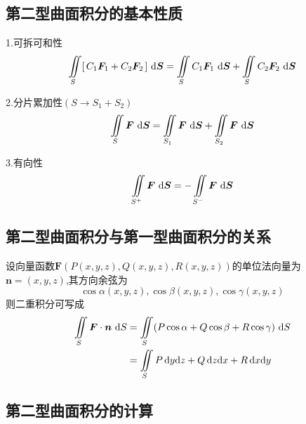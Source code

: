 \subsection{第二型曲面积分的基本性质}
\ttheorem[第二型曲面积分的三个基本性质]
1.可拆可和性
\begin{equation}
	\iint\limits_{S}[\,C_1\bm{F}_1+C_2\bm{F}_2\,]\,\,{\rm{d}} \bm{S} =\iint\limits_{S}C_1\bm{F}_1\,\,{\rm{d}} \bm{S}  + \iint\limits_{S}C_2\bm{F}_2\,\,{\rm{d}} \bm{S} 
\end{equation}

\par 2.分片累加性$(S\rightarrow S_1+S_2)$
\begin{equation}
	\iint\limits_{S}\bm{F}\,\,{\rm{d}} \bm{S}  = \iint\limits_{S_1}\bm{F}\,\,{\rm{d}} \bm{S}  +\iint\limits_{S_2}\bm{F}\,\,{\rm{d}} \bm{S} 
\end{equation}

\par 3.有向性
\begin{equation}
	\iint\limits_{S^+}\bm{F}\,\,{\rm{d}} \bm{S} = -\iint\limits_{S^-}\bm{F}\,\,{\rm{d}} \bm{S} 
\end{equation}

\subsection{第二型曲面积分与第一型曲面积分的关系}
\ttheorem[第二型曲面积分与第一型曲面积分的关系]
设向量函数$\bm{F}(P(x,y,z),Q(x,y,z),R(x,y,z))$的单位法向量为$\bm{n}=(x,y,z)$,其方向余弦为
\[
\cos \alpha (x,y,z),\cos \beta (x,y,z),\cos \gamma(x,y,z)
\]
则二重积分可写成
\begin{equation}
	\begin{split}
		\iint\limits_{S}\bm{F}\cdot \bm{n}\,\,{\rm{d}} S&=\iint\limits_{S}(P\cos \alpha +Q\cos \beta +R\cos \gamma )\,\,{\rm{d}} S\\
		&=\iint\limits_{S}P \,{\rm{d}} y{\rm{d}} z+Q\,{\rm{d}} z{\rm{d}} x+R\,{\rm{d}} x{\rm{d}} y
	\end{split}
\end{equation}

\subsection{第二型曲面积分的计算}
\begin{table}[h]
	\centering
	\renewcommand{\arraystretch}{1.6}
	\caption{不同的曲面方程的方向余弦}
	\renewcommand{\arraystretch}{1}
	\label{方向余弦}
\end{table} 

